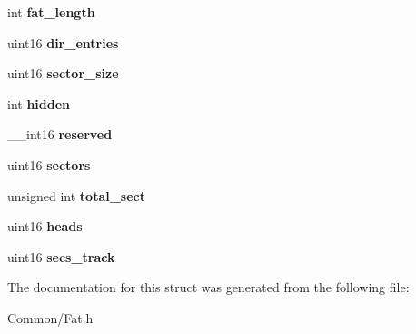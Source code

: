 \begin{DoxyCompactItemize}
int {\bfseries fat\+\_\+length}
\item 
\mbox{\label{structfatparams__t_af1be37913856262e330c27fb58b2157e}} 
uint16 {\bfseries dir\+\_\+entries}
\item 
\mbox{\label{structfatparams__t_a83f3cb3bb1b3b36bd1f1648f38f65684}} 
uint16 {\bfseries sector\+\_\+size}
\item 
\mbox{\label{structfatparams__t_a3935c39e8106c6f161fd0430897c4453}} 
int {\bfseries hidden}
\item 
\mbox{\label{structfatparams__t_a9e4965f1d27186c1794327137f60014e}} 
\+\_\+\+\_\+int16 {\bfseries reserved}
\item 
\mbox{\label{structfatparams__t_a313df53fdcb26858257cfcb2c3ad162f}} 
uint16 {\bfseries sectors}
\item 
\mbox{\label{structfatparams__t_abf3851d3ce07cfbae32da86a5c1f3258}} 
unsigned int {\bfseries total\+\_\+sect}
\item 
\mbox{\label{structfatparams__t_a378b5f0597aa8297a36aa7d728a61a49}} 
uint16 {\bfseries heads}
\item 
\mbox{\label{structfatparams__t_a6783763e905bf9703858c8ecf8bbe4a2}} 
uint16 {\bfseries secs\+\_\+track}
\end{DoxyCompactItemize}


The documentation for this struct was generated from the following file\+:\begin{DoxyCompactItemize}
\item 
Common/Fat.\+h\end{DoxyCompactItemize}
